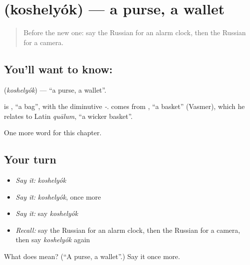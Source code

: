 \section[\texorpdfstring{\ru{кошелёк} (koshelyók)}{кошелёк (koshelyók)}]{ (koshelyók) — a purse, a wallet}

\label{lesson:RU-C99-purse}



\begin{quote}
Before the new one: say the Russian for an alarm clock, then the Russian for a camera.
\end{quote}

\subsection*{You'll want to know: }
\textbf{} (\emph{koshelyók}) — \textquotedblleft{}a purse, a wallet\textquotedblright{}.

\begin{cousinweb}
\textbf{} is \emph{}, \textquotedblleft{}a bag\textquotedblright{}, with the diminutive \emph{-}. \emph{} comes from \emph{}, \textquotedblleft{}a basket\textquotedblright{} (Vasmer), which he relates to Latin \emph{quālum}, \textquotedblleft{}a wicker basket\textquotedblright{}.
\end{cousinweb}

\begin{grammarlens}[title={What you've built}]
One more word for this chapter.
\end{grammarlens}

\subsection*{Your turn}
\begin{itemize}
\raggedright
  \item \emph{Say it:} \emph{koshelyók}
  \item \emph{Say it:} \emph{koshelyók}, once more
  \item \emph{Say it:} say \emph{koshelyók}
  \item \emph{Recall:} say the Russian for an alarm clock, then the Russian for a camera, then say \emph{koshelyók} again
\end{itemize}

\begin{tcolorbox}[breakable,colback=teal!4,colframe=teal!35!black,title={Before you move on}]
What does  mean? (\textquotedblleft{}A purse, a wallet\textquotedblright{}.) Say it once more.
\end{tcolorbox}
